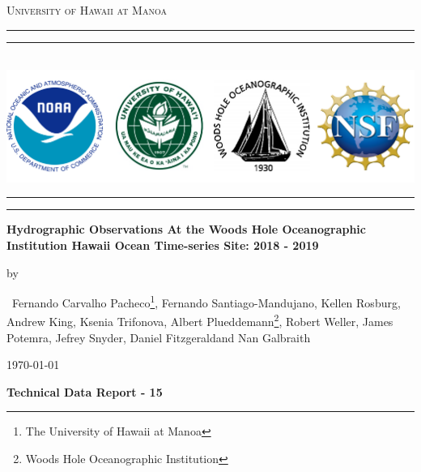 \begin{titlepage}
    	\centering
    	
    	{\scshape\Large {University of Hawaii at Manoa} \par}
    	
    	\rule{\textwidth}{0.4pt}\vspace*{-\baselineskip}\vspace{3.2pt} 
    	\rule{\textwidth}{1.6pt}
    	
    	\vspace{1cm}
    	
        \hbox{\hspace{0em} \includegraphics[width=16cm]{2.Figures/logos/alll_whot_report.png}}
    	\rule{\textwidth}{1.6pt}\vspace*{-\baselineskip}\vspace*{2pt} %
    	\rule{\textwidth}{0.4pt} %
    	
    	{\Large \textbf{Hydrographic Observations At the Woods Hole Oceanographic Institution Hawaii Ocean Time-series Site: 2018 - 2019} \par}
    	
        by\par
    	
    	{\normalsize \ 
    	Fernando Carvalho Pacheco\footnote{The University of Hawaii at Manoa}, 
    	Fernando Santiago-Mandujano\footnotemark[\value{footnote}], 
    	Kellen Rosburg\footnotemark[\value{footnote}],
    	Andrew King\footnotemark[\value{footnote}],
    	Ksenia Trifonova\footnotemark[\value{footnote}],
    	Albert Plueddemann\footnote{Woods Hole Oceanographic Institution},
    	Robert Weller\footnotemark[\value{footnote}],
    	James Potemra\footnotemark[1],
    	Jefrey Snyder\footnotemark[1],  
    	Daniel Fitzgerald\footnotemark[1] 
    	and Nan Galbraith\footnotemark[2] \par}
  	    
  	    \vspace{0.25cm}
        {\normalsize \today\par} 
        {\Large\bfseries Technical Data Report - 15 \par}
    	

\end{titlepage}
